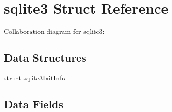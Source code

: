 \hypertarget{structsqlite3}{}\section{sqlite3 Struct Reference}
\label{structsqlite3}


Collaboration diagram for sqlite3\+:
\subsection*{Data Structures}
\begin{DoxyCompactItemize}
\item 
struct \hyperlink{structsqlite3_1_1sqlite3_init_info}{sqlite3\+Init\+Info}
\end{DoxyCompactItemize}
\subsection*{Data Fields}
